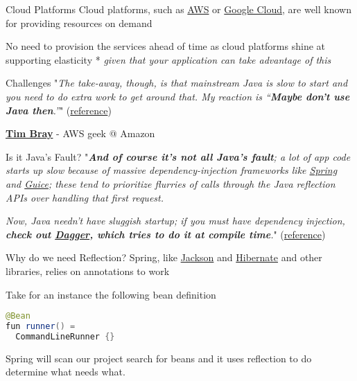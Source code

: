 \documentclass{beamer}
\begin{document}
  \begin{frame}[t]{Cloud Platforms}
    Cloud platforms, such as \href{https://aws.amazon.com/}{AWS} or \href{https://cloud.google.com/}{Google Cloud}, are well known for providing resources on demand

    No need to provision the services ahead of time as cloud platforms shine at supporting elasticity *
    \newline
    {\footnotesize * \textit{given that your application can take advantage of this}}
  \end{frame}


  \begin{frame}[t]{Challenges}
    "\textit{The take-away, though, is that mainstream Java is slow to start and you need to do extra work to get around that. My reaction is “\textbf{Maybe don’t use Java then}.”}" (\href{https://www.tbray.org/ongoing/When/201x/2018/12/14/SF-4}{reference})

    \href{https://www.linkedin.com/in/timbraysoftwareguy/}{\textbf{Tim Bray}} - AWS geek @ Amazon
  \end{frame}


  \begin{frame}[t]{Is it Java's Fault?}
    "\textit{\textbf{And of course it’s not all Java’s fault}; a lot of app code starts up slow because of massive dependency-injection frameworks like \href{https://spring.io/}{Spring} and \href{https://github.com/google/guice}{Guice}; these tend to prioritize flurries of calls through the Java reflection APIs over handling that first request.}

    \textit{Now, Java needn’t have sluggish startup; if you must have dependency injection, \textbf{check out \href{https://github.com/google/dagger}{Dagger}, which tries to do it at compile time}.}" (\href{https://www.tbray.org/ongoing/When/201x/2018/12/14/SF-4}{reference})
  \end{frame}


  \begin{frame}[t,fragile]{Why do we need Reflection?}
    Spring, like \href{https://github.com/FasterXML/jackson-module-kotlin}{Jackson} and \href{https://hibernate.org/orm/}{Hibernate} and other libraries, relies on annotations to work

    Take for an instance the following bean definition

    \vspace{16pt}
    \begin{lstlisting}[language=Java, backgroundcolor = \color{green!5}]
@Bean
fun runner() =
  CommandLineRunner {}
    \end{lstlisting}

    \vspace{16pt}
    Spring will scan our project search for beans and it uses reflection to do determine what needs what.
  \end{frame}
\end{document}

